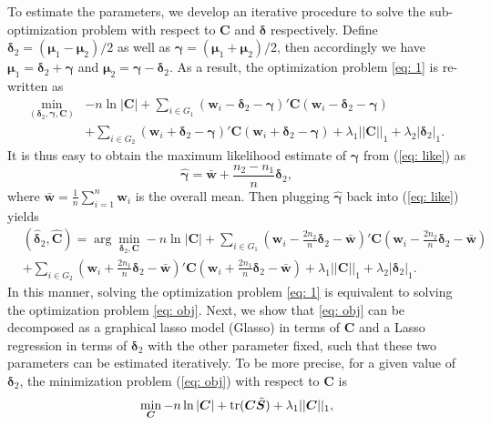\documentclass[12pt]{article}
\begin{document}
To estimate the parameters, we develop an iterative procedure to solve the sub-optimization problem with respect to $\bm C$ and $\bm \delta$ respectively.
Define $\bm \delta_2=(\bm \mu_1-\bm \mu_2)/2$ as well as $\bm \gamma=(\bm \mu_1+\bm \mu_2)/2$,
then accordingly we have $\bm \mu_1=\bm \delta_2+\bm \gamma$ and $\bm \mu_2=\bm \gamma-\bm \delta_2$.
As a result, the optimization problem \eqref{eq: 1} is re-written as
\begin{align}\label{eq: like}
\min_{(\bm \delta_2,\bm \gamma,\bm C)} &-n\ln|\bm C|+\sum_{i\in G_1}(\bm w_i-\bm \delta_2-\bm \gamma)'\bm C(\bm w_i-\bm \delta_2-\bm \gamma)\nonumber\\
&+\sum_{i\in G_2}(\bm w_i+\bm \delta_2-\bm \gamma)'\bm C(\bm w_i+\bm \delta_2-\bm \gamma)+\lambda_1||\bm C||_1+\lambda_2|\bm \delta_2|_1.
\end{align}
It is thus easy to obtain the maximum likelihood estimate of $\bm \gamma$ from (\ref{eq: like}) as
\begin{equation}\label{eq: gamma}
\hat{\bm \gamma}=\bar{\bm w}+\frac{n_2-n_1}{n}\bm \delta_2,
\end{equation}
where $\bar{\bm w}=\frac{1}{n}\sum_{i=1}^{n} \bm w_i$ is the overall mean. Then plugging $\hat{\bm \gamma}$ back into (\ref{eq: like}) yields
\begin{align}\label{eq: obj}
&(\hat{\bm \delta}_2, \hat{\bm C}) = \arg\min_{\bm \delta_2, \bm C} -n\ln|\bm C|+\sum_{i \in G_1}(\bm w_i-\frac{2n_2}{n}\bm \delta_2-\bar{\bm w})'\bm C(\bm w_i-\frac{2n_2}{n}\bm \delta_2-\bar{\bm w})\nonumber\\
&+\sum_{i \in G_2}(\bm w_i+\frac{2n_1}{n}\bm \delta_2-\bar{\bm w})'\bm C(\bm w_i+\frac{2n_1}{n}\bm \delta_2-\bar{\bm w})+\lambda_1||\bm C||_1+\lambda_2|\bm \delta_2|_1.
\end{align}
In this manner, solving the optimization problem \eqref{eq: 1} is equivalent to solving the optimization problem \eqref{eq: obj}.
Next, we show that \eqref{eq: obj} can be decomposed as a graphical lasso model (Glasso) \citep{yuan2007model, deng2009large} in terms of $\bm C$ and a Lasso regression \citep{tibshirani1996regression} in terms of $\bm \delta_2$ with the other parameter fixed,
such that these two parameters can be estimated iteratively.
To be more precise, for a given value of $\bm \delta_2$, the minimization problem (\ref{eq: obj}) with respect to $\bm C$ is
\begin{equation}\label{eq: 2}
\min_{\bm C} -n\ln|\bm C|+\hbox{tr}(\bm C\tilde{\bm S})+\lambda_1||\bm C||_1,
\end{equation}
\end{document}
